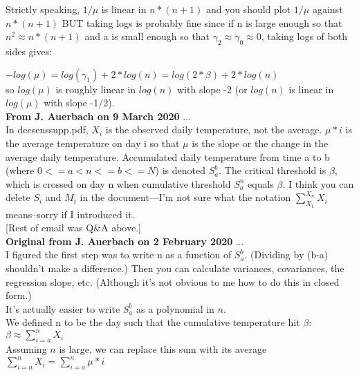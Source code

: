 \documentclass[11pt,letter]{article}
\begin{document}
Strictly speaking, $1 / \mu$ is linear in $n*(n+1)$ and you should plot $1 / \mu$ against $n * (n+1)$ BUT taking logs is probably fine since if n is large enough so that $n^2 \approx n * (n+1)$ and a is small enough so that $\gamma_2 \approx \gamma_0 \approx 0$, taking logs of both sides gives:

$-log(\mu) = log(\gamma_1) + 2 * log(n) = log(2 * \beta) + 2 * log(n)$\\

so $log(\mu)$ is roughly linear in $log(n)$ with slope -2 (or $log(n)$ is linear in $log(\mu)$ with slope -1/2).\\


{\bf From J. Auerbach on 9 March 2020} ...\\
In decsenssupp.pdf, $X_i$ is the observed daily temperature, not the average. $\mu * i$ is the average temperature on day i so that $\mu$ is the slope or the change in the average daily temperature. Accumulated daily temperature from time a to b (where $0 <= a < n <= b <= N$) is denoted $S_a^b$. The critical threshold is $\beta$, which is crossed on day n when cumulative threshold $S_a^n$ equals $\beta$. I think you can delete $S_i$ and $M_i$ in the document—I'm not sure what the notation $\sum_{X_1}^{X_n} X_i$ means--sorry if I introduced it.\\

[Rest of email was Q\&A above.]\\

{\bf Original from J. Auerbach on 2 February 2020} ...\\
I figured the first step was to write n as a function of $S_a^b$. (Dividing by (b-a) shouldn't make a difference.) Then you can calculate variances, covariances, the regression slope, etc. (Although it's not obvious to me how to do this in closed form.)\\

It's actually easier to write $S_a^b$ as a polynomial in $n$.\\

We defined n to be the day such that the cumulative temperature hit $\beta$:\\

$\beta \approx \sum_{i=a}^n X_i$\\

Assuming $n$ is large, we can replace this sum with its average\\

$\sum_{i=a}^n X_i = \sum_{i=a}^n \mu * i$\\
\end{document}
